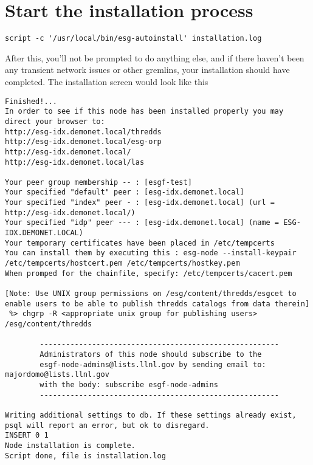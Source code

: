 \section{Start the installation
process}\label{start-the-installation-process}

\begin{verbatim}
script -c '/usr/local/bin/esg-autoinstall' installation.log
\end{verbatim}

After this, you'll not be prompted to do anything else, and if there
haven't been any transient network issues or other gremlins, your
installation should have completed. The installation screen would look
like this

\begin{verbatim}
Finished!...
In order to see if this node has been installed properly you may direct your browser to:
http://esg-idx.demonet.local/thredds
http://esg-idx.demonet.local/esg-orp
http://esg-idx.demonet.local/
http://esg-idx.demonet.local/las

Your peer group membership -- : [esgf-test]
Your specified "default" peer : [esg-idx.demonet.local]
Your specified "index" peer - : [esg-idx.demonet.local] (url = http://esg-idx.demonet.local/)
Your specified "idp" peer --- : [esg-idx.demonet.local] (name = ESG-IDX.DEMONET.LOCAL)
Your temporary certificates have been placed in /etc/tempcerts
You can install them by executing this : esg-node --install-keypair /etc/tempcerts/hostcert.pem /etc/tempcerts/hostkey.pem
When promped for the chainfile, specify: /etc/tempcerts/cacert.pem

[Note: Use UNIX group permissions on /esg/content/thredds/esgcet to enable users to be able to publish thredds catalogs from data therein]
 %> chgrp -R <appropriate unix group for publishing users> /esg/content/thredds

        -------------------------------------------------------
        Administrators of this node should subscribe to the
        esgf-node-admins@lists.llnl.gov by sending email to: majordomo@lists.llnl.gov
        with the body: subscribe esgf-node-admins
        -------------------------------------------------------

Writing additional settings to db. If these settings already exist, psql will report an error, but ok to disregard.
INSERT 0 1
Node installation is complete.
Script done, file is installation.log
\end{verbatim}

